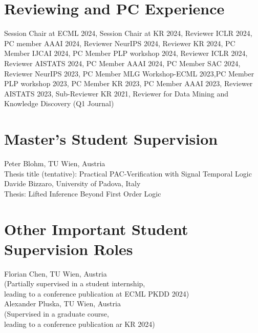 \documentclass[10pt, a4paper]{article}
\newcommand{\years}[1]{\marginnote{\scriptsize #1}}
\begin{document}



\section*{Reviewing and PC Experience}
Session Chair at ECML 2024, Session Chair at KR 2024, Reviewer ICLR 2024, PC member AAAI 2024, Reviewer NeurIPS 2024, Reviewer KR 2024, PC Member IJCAI 2024, PC Member PLP workshop 2024, Reviewer ICLR 2024, Reviewer AISTATS 2024, PC Member AAAI 2024, PC Member SAC 2024, Reviewer NeurIPS 2023, PC Member MLG Workshop-ECML 2023,PC Member PLP workshop 2023, PC Member  KR 2023, PC Member  AAAI 2023, Reviewer  AISTATS 2023, Sub-Reviewer  KR 2021, Reviewer for  Data Mining and Knowledge Discovery (Q1 Journal)


\section*{Master's Student Supervision}
\years{2024} Peter Blohm,  TU Wien, Austria\\
Thesis title (tentative): Practical PAC-Verification with Signal Temporal Logic \\ 

\years{2023} Davide Bizzaro,  University of Padova, Italy\\
Thesis: Lifted Inference Beyond First Order Logic 

\section*{Other Important Student Supervision Roles}
    \years{2024} Florian Chen, TU Wien, Austria\\
    (Partially supervised in a student internship,\\ leading to a conference publication at ECML PKDD 2024)\\

    \years{2024} Alexander Pluska,  TU Wien, Austria\\ 
    (Supervised in a graduate course,\\ leading to a conference publication ar KR 2024)\\
\end{document}
